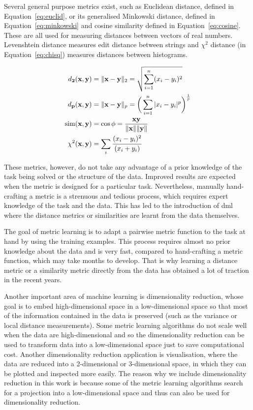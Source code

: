 \documentclass[12pt,a4paper]{report}
\begin{document}
Several general purpose metrics exist, such as Euclidean distance, defined in Equation~\ref{eq:euclid}, or its generalised Minkowski distance, defined in Equation~\ref{eq:minkowski} and cosine similarity defined in Equation~\ref{eq:cosine}. These are all used for measuring distances between vectors of real numbers. Levenshtein distance measures edit distance between strings and $\chi^2$ distance (in Equation~\ref{eq:chisq}) measures distances between histograms.

\begin{align}
d_{\mathbf{2}}(\textbf{x}, \textbf{y}) &= \|\textbf{x}-\textbf{y}\|_2 = \sqrt{\sum_{i=1}^{n} (x_i-y_i)^2} \label{eq:euclid} \\
d_{\mathbf{p}}(\textbf{x}, \textbf{y}) &= \|\textbf{x}-\textbf{y}\|_p = \bigg(\sum_{i=1}^{n} |x_i-y_i|^p\bigg)^\frac{1}{p} \label{eq:minkowski} \\
\mathrm{sim}(\textbf{x}, \textbf{y}) &= \cos{\phi} = \frac{\textbf{x}\textbf{y}}{\|\textbf{x}\|\|\textbf{y}\|} \label{eq:cosine} \\
\chi^2(\textbf{x}, \textbf{y}) &= \sum_{i} \cfrac{(x_i - y_i)^2} {(x_i + y_i)} \label{eq:chisq}
\end{align}

These metrics, however, do not take any advantage of a prior knowledge of the task being solved or the structure of the data. Improved results are expected when the metric is designed for a particular task. Nevertheless, manually hand-crafting a metric is a strenuous and tedious process, which requires expert knowledge of the task and the data. This has led to the introduction of \ac{dml} where the distance metrics or similarities are learnt from the data themselves.

The goal of metric learning is to adapt a pairwise metric function to the task at hand by using the training examples. This process requires almost no prior knowledge about the data and is very fast, compared to hand-crafting a metric function, which may take months to develop. That is why learning a distance metric or a similarity metric directly from the data has obtained a lot of traction in the recent years.

Another important area of machine learning is dimensionality reduction, whose goal is to embed high-dimensional space in a low-dimensional space so that most of the information contained in the data is preserved (such as the variance or local distance measurements). Some metric learning algorithms do not scale well when the data are high-dimensional and so the dimensionality reduction can be used to transform data into a low-dimensional space just to save computational cost. Another dimensionality reduction application is visualisation, where the data are reduced into a 2-dimensional or 3-dimensional space, in which they can be plotted and inspected more easily. The reason why we include dimensionality reduction in this work is because some of the metric learning algorithms search for a projection into a low-dimensional space and thus can also be used for dimensionality reduction.
\end{document}
